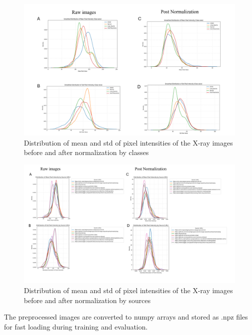 \documentclass{article}
\begin{document}
\begin{figure}[h!] %
    \centering
    \includegraphics[width=1.0\linewidth]{Screenshot 2025-04-21 223200.png}
    \caption{Distribution of mean and std of pixel intensities of the X-ray images before and after normalization by classes}
    \label{fig:KDE_pre_post_normalization_class}
\end{figure}

\begin{figure}[h!] %
    \centering
    \includegraphics[width=1.0\linewidth]{Screenshot 2025-04-21 223207.png}
    \caption{Distribution of mean and std of pixel intensities of the X-ray images before and after normalization by sources}
    \label{fig:KDE_pre_post_normalization_URL}
\end{figure}

The preprocessed images are converted to numpy arrays and stored as .npz files for fast loading during training and evaluation.


\end{document}
